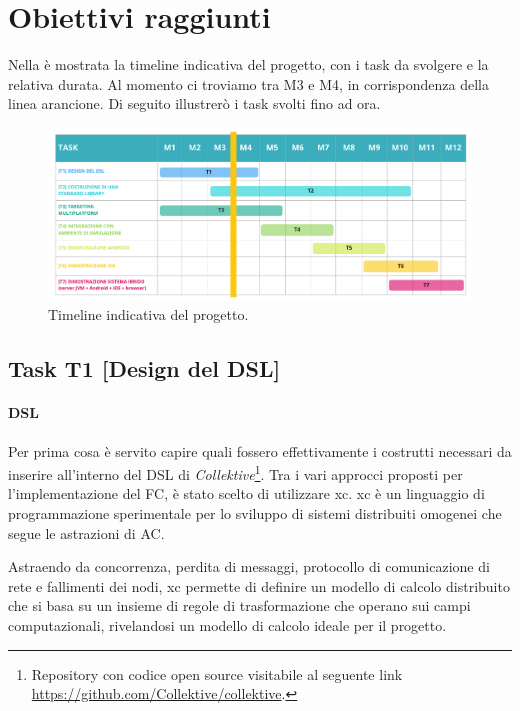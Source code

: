 \documentclass[13pt, a4paper]{article}
\newcommand{\ck}{\emph{Collektive}}
\begin{document}
\section{Obiettivi raggiunti}\label{sec:obiettivi-raggiunti}

Nella  è mostrata la timeline indicativa del progetto, con i task da svolgere e la relativa durata.
%
Al momento ci troviamo tra M3 e M4, in corrispondenza della linea arancione.
%
Di seguito illustrerò i task svolti fino ad ora.

\begin{figure}
    \centering
    \includegraphics[width=\textwidth]{images/collektive_timeline}
    \caption{Timeline indicativa del progetto.}
    \label{fig:timeline}
\end{figure}

\subsection{Task T1 [Design del DSL]}\label{subsec:t1}

\paragraph{DSL}
Per prima cosa è servito capire quali fossero effettivamente i costrutti necessari da inserire all'interno del DSL di \ck{}\footnote{
    Repository con codice open source visitabile al seguente link \url{https://github.com/Collektive/collektive}.
}.
%
Tra i vari approcci proposti per l'implementazione del \ac{FC}, è stato scelto di utilizzare \ac{xc}.
%
\ac{xc} è un linguaggio di programmazione sperimentale per lo sviluppo di sistemi distribuiti omogenei che segue le astrazioni
    di \ac{AC}.

Astraendo da concorrenza, perdita di messaggi, protocollo di comunicazione di rete e fallimenti dei nodi,
    \ac{xc} permette di definire un modello di calcolo distribuito che si basa su un insieme di regole di trasformazione
    che operano sui campi computazionali,
    rivelandosi un modello di calcolo ideale per il progetto.
\end{document}
